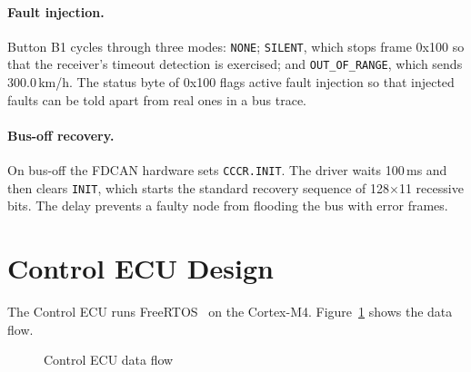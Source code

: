 \paragraph{Fault injection.} Button B1 cycles through three modes: \texttt{NONE}; \texttt{SILENT}, which stops frame 0x100 so that the receiver's timeout detection is exercised; and \texttt{OUT\_OF\_RANGE}, which sends 300.0\,km/h. The status byte of 0x100 flags active fault injection so that injected faults can be told apart from real ones in a bus trace.

\paragraph{Bus-off recovery.} On bus-off the FDCAN hardware sets \texttt{CCCR.INIT}. The driver waits 100\,ms and then clears \texttt{INIT}, which starts the standard recovery sequence of 128$\times$11 recessive bits. The delay prevents a faulty node from flooding the bus with error frames.

\section{Control ECU Design}

The Control ECU runs FreeRTOS~\cite{FreeRTOS} on the Cortex-M4. Figure~\ref{fig:ctrl_flow} shows the data flow.

\begin{figure}[H]
\centering
{}
\caption{Control ECU data flow}
\label{fig:ctrl_flow}
\end{figure}

